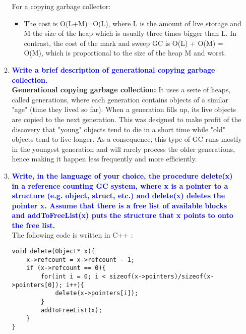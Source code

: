 \documentclass[10pt]{article}
\begin{document}
\begin{enumerate}
\begin{enumerate}
            For a copying garbage collector:
            \begin{itemize}
                \item The cost is O(L+M)=O(L), where L is the amount of live storage and M the size of the heap which is usually three times bigger than L. In contrast, the cost of the mark and sweep GC is O(L) + O(M) = O(M), which is proportional to the size of the heap M and worst.
            \end{itemize}
        \item \textbf{\textcolor{blue}{Write a brief description of generational copying garbage collection.}}
            \\ \textbf{Generational copying garbage collection:} It uses a serie of heaps, called generations, where each generation contains objects of a similar "age" (time they lived so far). When a generation fills up, its live objects are copied to the next generation. This was designed to make profit of the discovery that  "young" objects tend to die in a short time while "old" objects tend to live longer. As a consequence, this type of GC runs mostly in the youngest generation and will rarely process the older generations, hence making it happen less frequently and more efficiently.
        \item \textbf{\textcolor{blue}{Write, in the language of your choice, the procedure delete(x) in a reference counting GC system, where x is a pointer to a structure (e.g. object, struct, etc.) and delete(x) deletes the pointer x. Assume that there is a free list of available blocks and addToFreeList(x) puts the structure that x points to onto the free list.}}
        \\ The following code is written in C++ :
        \begin{verbatim}
void delete(Object* x){
    x->refcount = x->refcount - 1;
    if (x->refcount == 0){
        for(int i = 0; i < sizeof(x->pointers)/sizeof(x->pointers[0]); i++){
            delete(x->pointers[i]);
        }
        addToFreeList(x);
    }
}
        \end{verbatim}
    \end{enumerate}
\end{enumerate}
\end{document}

